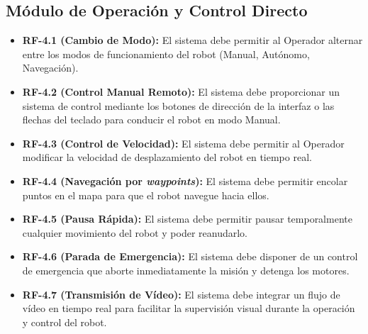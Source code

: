\subsection{Módulo de Operación y Control Directo}
\begin{itemize}
    \item \textbf{RF-4.1 (Cambio de Modo):} El sistema debe permitir al Operador alternar entre los modos de funcionamiento del robot (Manual, Autónomo, Navegación).
    \item \textbf{RF-4.2 (Control Manual Remoto):} El sistema debe proporcionar un sistema de control mediante los botones de dirección de la interfaz o las flechas del teclado para conducir el robot en modo Manual.
    \item \textbf{RF-4.3 (Control de Velocidad):} El sistema debe permitir al Operador modificar la velocidad de desplazamiento del robot en tiempo real.
    \item \textbf{RF-4.4 (Navegación por \textit{waypoints}):} El sistema debe permitir encolar puntos en el mapa para que el robot navegue hacia ellos.
    \item \textbf{RF-4.5 (Pausa Rápida):} El sistema debe permitir pausar temporalmente cualquier movimiento del robot y poder reanudarlo.
    \item \textbf{RF-4.6 (Parada de Emergencia):} El sistema debe disponer de un control de emergencia que aborte inmediatamente la misión y detenga los motores.
    \item \textbf{RF-4.7 (Transmisión de Vídeo):} El sistema debe integrar un flujo de vídeo en tiempo real para facilitar la supervisión visual durante la operación y control del robot.
\end{itemize}

